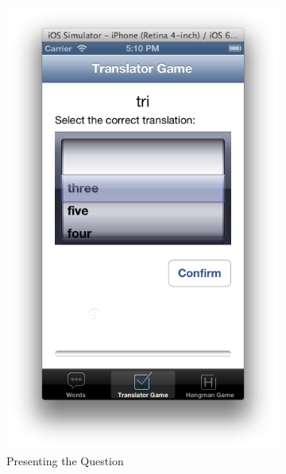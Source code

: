\documentclass[11pt, a4paper]{article}
\begin{document}
\begin{figure}[h]
\centering
\begin{subfigure}[b]{0.3\textwidth}
\includegraphics[width=\textwidth]{img/trans-game}
\caption{Presenting the Question}
\end{subfigure}
\begin{subfigure}[b]{0.3\textwidth}

\end{subfigure}
\end{figure}
\end{document}
